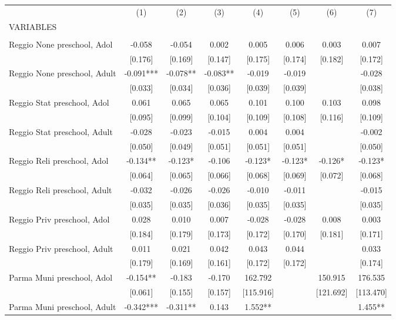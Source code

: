 \begin{tabular}{lccccccc} \hline
 & (1) & (2) & (3) & (4) & (5) & (6) & (7) \\
VARIABLES &  &  &  &  &  &  &  \\ \hline
 &  &  &  &  &  &  &  \\
Reggio None preschool, Adol & -0.058 & -0.054 & 0.002 & 0.005 & 0.006 & 0.003 & 0.007 \\
 & [0.176] & [0.169] & [0.147] & [0.175] & [0.174] & [0.182] & [0.172] \\
Reggio None preschool, Adult & -0.091*** & -0.078** & -0.083** & -0.019 & -0.019 &  & -0.028 \\
 & [0.033] & [0.034] & [0.036] & [0.039] & [0.039] &  & [0.038] \\
Reggio Stat preschool, Adol & 0.061 & 0.065 & 0.065 & 0.101 & 0.100 & 0.103 & 0.098 \\
 & [0.095] & [0.099] & [0.104] & [0.109] & [0.108] & [0.116] & [0.109] \\
Reggio Stat preschool, Adult & -0.028 & -0.023 & -0.015 & 0.004 & 0.004 &  & -0.002 \\
 & [0.050] & [0.049] & [0.051] & [0.051] & [0.051] &  & [0.050] \\
Reggio Reli preschool, Adol & -0.134** & -0.123* & -0.106 & -0.123* & -0.123* & -0.126* & -0.123* \\
 & [0.064] & [0.065] & [0.066] & [0.068] & [0.069] & [0.072] & [0.068] \\
Reggio Reli preschool, Adult & -0.032 & -0.026 & -0.026 & -0.010 & -0.011 &  & -0.015 \\
 & [0.035] & [0.035] & [0.036] & [0.035] & [0.035] &  & [0.035] \\
Reggio Priv preschool, Adol & 0.028 & 0.010 & 0.007 & -0.028 & -0.028 & 0.008 & 0.003 \\
 & [0.184] & [0.179] & [0.173] & [0.172] & [0.170] & [0.181] & [0.171] \\
Reggio Priv preschool, Adult & 0.011 & 0.021 & 0.042 & 0.043 & 0.044 &  & 0.033 \\
 & [0.179] & [0.169] & [0.161] & [0.172] & [0.172] &  & [0.174] \\
Parma Muni preschool, Adol & -0.154** & -0.183 & -0.170 & 162.792 &  & 150.915 & 176.535 \\
 & [0.061] & [0.155] & [0.157] & [115.916] &  & [121.692] & [113.470] \\
Parma Muni preschool, Adult & -0.342*** & -0.311** & 0.143 & 1.552** &  &  & 1.455** \\

\end{tabular}
